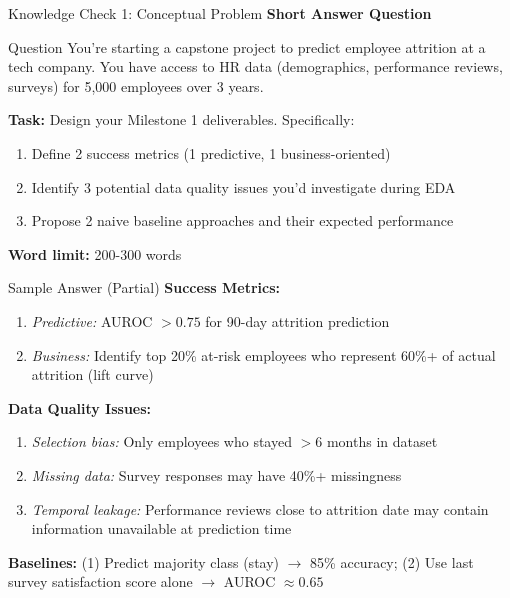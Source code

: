 \begin{frame}{Knowledge Check 1: Conceptual Problem}
\textbf{Short Answer Question}

\vspace{0.3cm}

\begin{block}{Question}
You're starting a capstone project to predict employee attrition at a tech company. You have access to HR data (demographics, performance reviews, surveys) for 5,000 employees over 3 years.

\textbf{Task:} Design your Milestone 1 deliverables. Specifically:
\begin{enumerate}
\item Define 2 success metrics (1 predictive, 1 business-oriented)
\item Identify 3 potential data quality issues you'd investigate during EDA
\item Propose 2 naive baseline approaches and their expected performance
\end{enumerate}

\textbf{Word limit:} 200-300 words
\end{block}

\pause

\vspace{0.2cm}

\begin{block}{Sample Answer (Partial)}
\small
\textbf{Success Metrics:}
\begin{enumerate}
\item \textit{Predictive:} AUROC $> 0.75$ for 90-day attrition prediction
\item \textit{Business:} Identify top 20\% at-risk employees who represent 60\%+ of actual attrition (lift curve)
\end{enumerate}

\textbf{Data Quality Issues:}
\begin{enumerate}
\item \textit{Selection bias:} Only employees who stayed $>6$ months in dataset
\item \textit{Missing data:} Survey responses may have 40\%+ missingness
\item \textit{Temporal leakage:} Performance reviews close to attrition date may contain information unavailable at prediction time
\end{enumerate}

\textbf{Baselines:} (1) Predict majority class (stay) $\to$ 85\% accuracy; (2) Use last survey satisfaction score alone $\to$ AUROC $\approx 0.65$
\end{block}
\end{frame}

